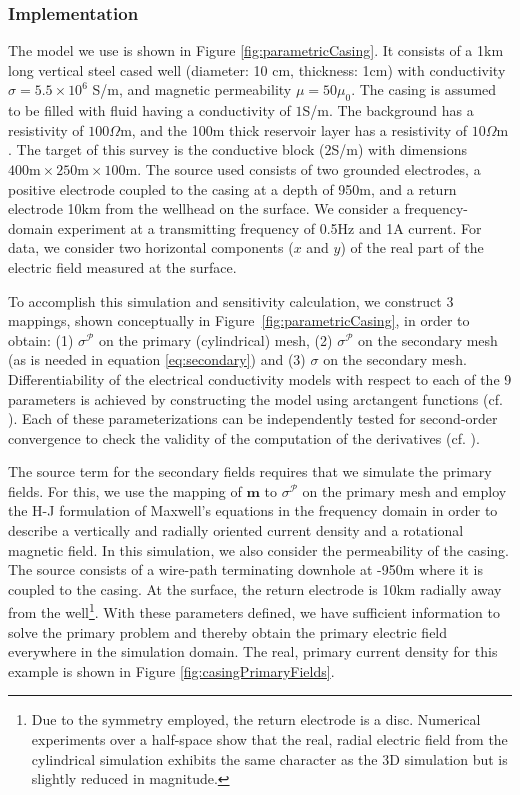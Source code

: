 
\subsubsection{Implementation}
\label{sec:casingImplementation}

The model we use is shown in Figure \ref{fig:parametricCasing}. It  consists of a
1km long vertical steel cased well (diameter: 10 cm, thickness: 1cm) with
conductivity $\sigma= 5.5\times10^6$ S/m, and magnetic permeability $\mu= 50
\mu_0$. The casing is assumed to be filled with fluid having a conductivity of
$1$S/m. The background has a resistivity of $100\Omega \text{m}$, and the 100m
thick reservoir layer has a resistivity of $10\Omega \text{m}$. The target of this
survey is the conductive block ($2$S/m) with dimensions $400 \text{m} \times
250 \text{m} \times 100\text{m}$. The source used consists of two grounded
electrodes, a positive electrode coupled to the casing at a depth of 950m,
and a return electrode 10km from the wellhead on the surface. We consider a
frequency-domain experiment at a transmitting frequency of 0.5Hz and 1A
current. For data, we consider two horizontal components ($x$ and $y$) of the
real part of the electric field measured at the surface.

To accomplish this simulation and sensitivity calculation, we construct 3
mappings, shown conceptually in Figure~\ref{fig:parametricCasing},
in order to obtain: (1) $\sigma^\mathcal{P}$ on the primary (cylindrical) mesh,
(2) $\sigma^\mathcal{P}$ on the secondary mesh (as is needed in equation
\ref{eq:secondary}) and (3) $\sigma$ on the secondary mesh. Differentiability of
the electrical conductivity models with respect to each of the 9 parameters is
achieved by constructing the model using arctangent functions (cf.
\cite{Aghasi2011, McMillan2015}). Each of these parameterizations can be
independently tested for second-order convergence to check the validity of the
computation of the derivatives (cf. \cite{Haber2014a}).

The source term for the secondary fields requires that we simulate the primary
fields. For this, we use the mapping of $\mathbf{m}$ to $\sigma^\mathcal{P}$
on the primary mesh and employ the H-J formulation of Maxwell's equations in
the frequency domain in order to describe a vertically and radially oriented
current density and a rotational magnetic field. In this simulation, we also
consider the permeability of the casing. The source consists of a wire-path
terminating downhole at -950m where it is coupled to the casing. At the
surface, the return electrode is 10km radially away from the well\footnote{Due
to the symmetry employed, the return electrode is a disc. Numerical
experiments over a half-space show that the real, radial electric field from
the cylindrical simulation exhibits the same character as the 3D simulation
but is slightly reduced in magnitude.}. With these parameters defined, we have
sufficient information to solve the primary problem and thereby obtain the
primary electric field everywhere in the simulation domain. The real, primary
current density for this example is shown in Figure
\ref{fig:casingPrimaryFields}.

